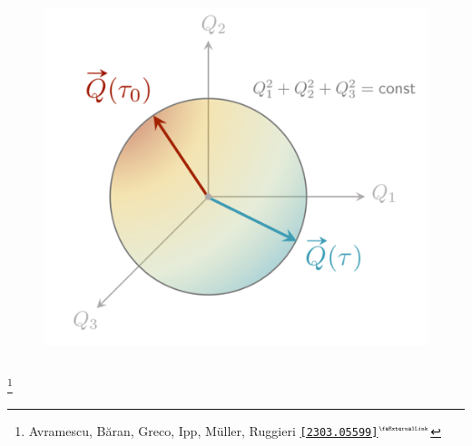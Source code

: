 \documentclass[aspectratio=169,11pt,usenames,dvipsnames]{beamer}
\renewcommand{\thefootnote}{\color{customblue}\faPaperPlaneO}
\newcommand\blfootnote[1]{%
  \begingroup
  \renewcommand\thefootnote{}\footnote{#1}%
  \addtocounter{footnote}{-1}%
  \endgroup
}
\begin{document}
\begin{frame}
\begin{columns}[onlytextwidth,t]
\begin{figure}[!hbt]
                \includegraphics[width=1.05\columnwidth]{images/wong_charge.png}
            \end{figure}
    \end{columns}

    \blfootnote{\scriptsize Avramescu, Băran, Greco, Ipp, Müller, Ruggieri  \href{https://arxiv.org/abs/2303.05599}{{\color{palgold}\texttt{[2303.05599]}$^\text{\tiny\faExternalLink}$}}}
\end{frame}



\end{document}
